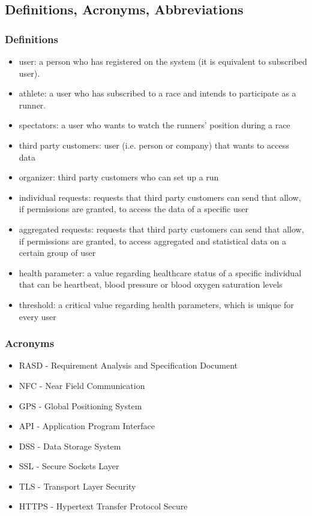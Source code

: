 \subsection{Definitions, Acronyms, Abbreviations}
\subsubsection{Definitions}
\begin{itemize}
\item user: a person who has registered on the system (it is equivalent to subscribed user).
\item athlete: a user who has subscribed to a race and intends to participate as a runner.
\item spectators: a user who wants to watch the runners' position during a race   
\item third party customers: user (i.e. person or company) that wants to access data
\item organizer: third party customers who can set up a run
\item individual requests: requests that third party customers can send that allow, if permissions are granted, to access the data of a specific user
\item aggregated requests: requests that third party customers can send that allow, if permissions are granted, to access aggregated and statistical data on a certain group of user
\item health parameter: a value regarding healthcare status of a specific individual that can be heartbeat, blood pressure or blood oxygen saturation levels 
\item threshold: a critical value regarding health parameters, which is unique for every user
\end{itemize}

\subsubsection{Acronyms}
\begin{itemize}
\item RASD - Requirement Analysis and Specification Document
\item NFC - Near Field Communication
\item GPS - Global Positioning System
\item API - Application Program Interface
\item DSS - Data Storage System
\item SSL - Secure Sockets Layer
\item TLS - Transport Layer Security
\item HTTPS - Hypertext Transfer Protocol Secure
\end{itemize}
